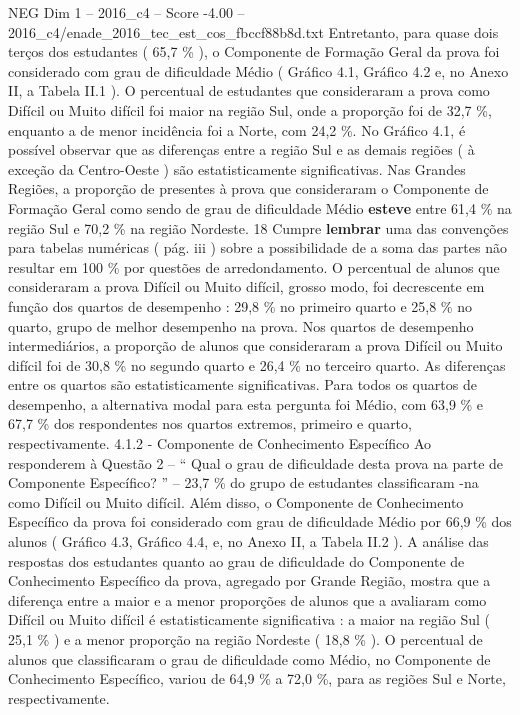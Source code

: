 \begin{textsample}{NEG Dim 1 – 2016\_c4 – Score -4.00 – 2016\_c4/enade\_2016\_tec\_est\_cos\_fbccf88b8d.txt}
Entretanto, para quase dois terços dos estudantes ( 65,7 \% ), o Componente de Formação Geral da prova foi considerado com grau de dificuldade Médio ( Gráfico 4.1, Gráfico 4.2 e, no Anexo II, a Tabela II.1 ).
O percentual de estudantes que consideraram a prova como Difícil ou Muito difícil foi maior na região Sul, onde a proporção foi de 32,7 \%, enquanto a de menor incidência foi a Norte, com 24,2 \%.
No Gráfico 4.1, é possível observar que as diferenças entre a região Sul e as demais regiões ( à exceção da Centro-Oeste ) são estatisticamente significativas.
Nas Grandes Regiões, a proporção de presentes à prova que consideraram o Componente de Formação Geral como sendo de grau de dificuldade Médio \textbf{esteve} entre 61,4 \% na região Sul e 70,2 \% na região Nordeste. 18 Cumpre \textbf{lembrar} uma das convenções para tabelas numéricas ( pág. iii ) sobre a possibilidade de a soma das partes não resultar em 100 \% por questões de arredondamento.
O percentual de alunos que consideraram a prova Difícil ou Muito difícil, grosso modo, foi decrescente em função dos quartos de desempenho : 29,8 \% no primeiro quarto e 25,8 \% no quarto, grupo de melhor desempenho na prova.
Nos quartos de desempenho intermediários, a proporção de alunos que consideraram a prova Difícil ou Muito difícil foi de 30,8 \% no segundo quarto e 26,4 \% no terceiro quarto.
As diferenças entre os quartos são estatisticamente significativas.
Para todos os quartos de desempenho, a alternativa modal para esta pergunta foi Médio, com 63,9 \% e 67,7 \% dos respondentes nos quartos extremos, primeiro e quarto, respectivamente. 4.1.2 - Componente de Conhecimento Específico Ao responderem à Questão 2 – “ Qual o grau de dificuldade desta prova na parte de Componente Específico? ” – 23,7 \% do grupo de estudantes classificaram -na como Difícil ou Muito difícil.
Além disso, o Componente de Conhecimento Específico da prova foi considerado com grau de dificuldade Médio por 66,9 \% dos alunos ( Gráfico 4.3, Gráfico 4.4, e, no Anexo II, a Tabela II.2 ).
A análise das respostas dos estudantes quanto ao grau de dificuldade do Componente de Conhecimento Específico da prova, agregado por Grande Região, mostra que a diferença entre a maior e a menor proporções de alunos que a avaliaram como Difícil ou Muito difícil é estatisticamente significativa : a maior na região Sul ( 25,1 \% ) e a menor proporção na região Nordeste ( 18,8 \% ).
O percentual de alunos que classificaram o grau de dificuldade como Médio, no Componente de Conhecimento Específico, variou de 64,9 \% a 72,0 \%, para as regiões Sul e Norte, respectivamente.

\end{textsample}
